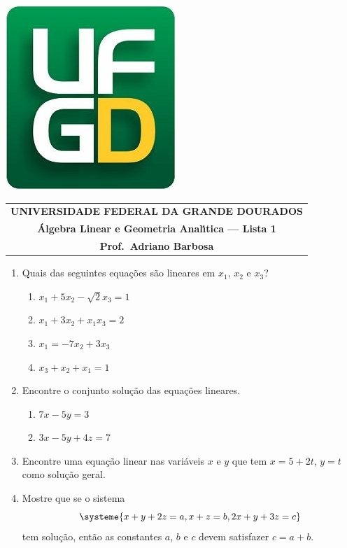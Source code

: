 \documentclass[a4paper,5pt]{amsbook}
\begin{document}
\thispagestyle{empty}
\begin{minipage}[h]{0.14\textwidth}
	\includegraphics[scale=0.24]{../../../ufgd.png}
\end{minipage}
\begin{minipage}[h]{\textwidth}
\begin{tabular}{c}
{{\bf UNIVERSIDADE FEDERAL DA GRANDE DOURADOS}}\\
{{\bf \'{A}lgebra Linear e Geometria Anal\'{\i}tica --- Lista 1}}\\
{{\bf Prof.\ Adriano Barbosa}}\\
\end{tabular}
\vspace{-0.45cm}
%
\end{minipage}

\vspace{1cm}

\begin{enumerate}
	\vspace{0.5cm}
	\item Quais das seguintes equa\c{c}\~oes s\~ao lineares em $x_1$, $x_2$ e $x_3$?
		\begin{enumerate}
			\item $x_1+5x_2-\sqrt{2}x_3=1$
			\item $x_1+3x_2+x_1x_3=2$
			\item $x_1 = -7x_2+3x_3$
			\item $x_3+x_2+x_1 = 1$
		\end{enumerate}

	\vspace{0.5cm}
	\item Encontre o conjunto solu\c{c}\~ao das equa\c{c}\~oes lineares.
		\begin{enumerate}
			\item $7x-5y=3$
			\item $3x-5y+4z=7$
		\end{enumerate}

	\vspace{0.5cm}
	\item Encontre uma equa\c{c}\~ao linear nas vari\'aveis $x$ e $y$ que tem $x=5+2t$, $y=t$ como solu\c{c}\~ao geral.

	\vspace{0.5cm}
	\item Mostre que se o sistema
		\[\systeme{
				x+y+2z=a,
				x+z=b,
				2x+y+3z=c}\]
	tem solu\c{c}\~ao, ent\~ao as constantes $a$, $b$ e $c$ devem satisfazer $c = a+b$.
\end{enumerate}
\end{document}
